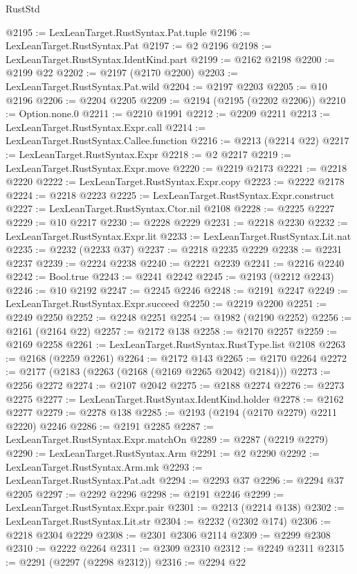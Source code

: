 \begin{lexlean}{RustStd}
\begin{coremodule}
{\begin{coremodule}
{{{{{{{{{{{{{{{{{{{{{{{{{{@2195 := LexLeanTarget.RustSyntax.Pat.tuple
@2196 := LexLeanTarget.RustSyntax.Pat
@2197 := @2 @2196
@2198 := LexLeanTarget.RustSyntax.IdentKind.part
@2199 := @2162 @2198
@2200 := @2199 @22
@2202 := @2197 (@2170 @2200)
@2203 := LexLeanTarget.RustSyntax.Pat.wild
@2204 := @2197 @2203
@2205 := @10 @2196
@2206 := @2204 @2205
@2209 := @2194 (@2195 (@2202 @2206))
@2210 := Option.none.{0}
@2211 := @2210 @1991
@2212 := @2209 @2211
@2213 := LexLeanTarget.RustSyntax.Expr.call
@2214 := LexLeanTarget.RustSyntax.Callee.function
@2216 := @2213 (@2214 @22)
@2217 := LexLeanTarget.RustSyntax.Expr
@2218 := @2 @2217
@2219 := LexLeanTarget.RustSyntax.Expr.move
@2220 := @2219 @2173
@2221 := @2218 @2220
@2222 := LexLeanTarget.RustSyntax.Expr.copy
@2223 := @2222 @2178
@2224 := @2218 @2223
@2225 := LexLeanTarget.RustSyntax.Expr.construct
@2227 := LexLeanTarget.RustSyntax.Ctor.nil @2108
@2228 := @2225 @2227
@2229 := @10 @2217
@2230 := @2228 @2229
@2231 := @2218 @2230
@2232 := LexLeanTarget.RustSyntax.Expr.lit
@2233 := LexLeanTarget.RustSyntax.Lit.nat
@2235 := @2232 (@2233 @37)
@2237 := @2218 @2235 @2229
@2238 := @2231 @2237
@2239 := @2224 @2238
@2240 := @2221 @2239
@2241 := @2216 @2240
@2242 := Bool.true
@2243 := @2241 @2242
@2245 := @2193 (@2212 @2243)
@2246 := @10 @2192
@2247 := @2245 @2246
@2248 := @2191 @2247
@2249 := LexLeanTarget.RustSyntax.Expr.succeed
@2250 := @2219 @2200
@2251 := @2249 @2250
@2252 := @2248 @2251
@2254 := @1982 (@2190 @2252)
@2256 := @2161 (@2164 @22)
@2257 := @2172 @138
@2258 := @2170 @2257
@2259 := @2169 @2258
@2261 := LexLeanTarget.RustSyntax.RustType.list @2108
@2263 := @2168 (@2259 @2261)
@2264 := @2172 @143
@2265 := @2170 @2264
@2272 := @2177 (@2183 (@2263 (@2168 (@2169 @2265 @2042) @2184)))
@2273 := @2256 @2272
@2274 := @2107 @2042
@2275 := @2188 @2274
@2276 := @2273 @2275
@2277 := LexLeanTarget.RustSyntax.IdentKind.holder
@2278 := @2162 @2277
@2279 := @2278 @138
@2285 := @2193 (@2194 (@2170 @2279) @2211 @2220) @2246
@2286 := @2191 @2285
@2287 := LexLeanTarget.RustSyntax.Expr.matchOn
@2289 := @2287 (@2219 @2279)
@2290 := LexLeanTarget.RustSyntax.Arm
@2291 := @2 @2290
@2292 := LexLeanTarget.RustSyntax.Arm.mk
@2293 := LexLeanTarget.RustSyntax.Pat.adt
@2294 := @2293 @37
@2296 := @2294 @37 @2205
@2297 := @2292 @2296
@2298 := @2191 @2246
@2299 := LexLeanTarget.RustSyntax.Expr.pair
@2301 := @2213 (@2214 @138)
@2302 := LexLeanTarget.RustSyntax.Lit.str
@2304 := @2232 (@2302 @174)
@2306 := @2218 @2304 @2229
@2308 := @2301 @2306 @2114
@2309 := @2299 @2308
@2310 := @2222 @2264
@2311 := @2309 @2310
@2312 := @2249 @2311
@2315 := @2291 (@2297 (@2298 @2312))
@2316 := @2294 @22
}}}}}}}}}}}}}}}}}}}}}}}}}}
\end{coremodule}}
\end{coremodule}
\end{lexlean}
